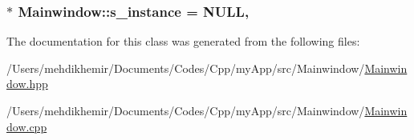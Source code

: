 \subsubsection[{s\+\_\+instance}]{ $\ast$ Mainwindow\+::s\+\_\+instance = N\+U\+L\+L\hspace{0.3cm}{\ttfamily [static]}, {\ttfamily [private]}}\label{class_mainwindow_a47858f9db0a0c89d7df36cb56925118d}


The documentation for this class was generated from the following files\+:\begin{DoxyCompactItemize}
\item 
/\+Users/mehdikhemir/\+Documents/\+Codes/\+Cpp/my\+App/src/\+Mainwindow/\hyperlink{_mainwindow_8hpp}{Mainwindow.\+hpp}\item 
/\+Users/mehdikhemir/\+Documents/\+Codes/\+Cpp/my\+App/src/\+Mainwindow/\hyperlink{_mainwindow_8cpp}{Mainwindow.\+cpp}\end{DoxyCompactItemize}
